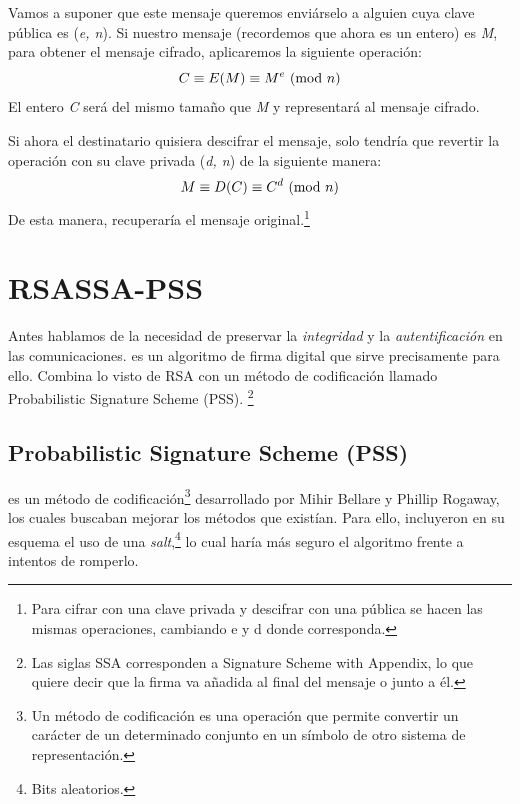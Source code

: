  Vamos a suponer que este mensaje queremos enviárselo a alguien cuya clave pública es (\emph{e, n}).
 Si nuestro mensaje (recordemos que ahora es un entero) es \emph{M}, para obtener el mensaje cifrado, aplicaremos la siguiente operación:
 \[ C \equiv E(M) \equiv M^e \ (\mathrm{mod}\ n) \]
 El entero \emph{C} será del mismo tamaño que \emph{M} y representará al mensaje cifrado.

 Si ahora el destinatario quisiera descifrar el mensaje, solo tendría que revertir la operación con su clave privada (\emph{d, n}) de la siguiente manera:
 \[ M \equiv D(C) \equiv C^d \ (\mathrm{mod}\ n) \]
 De esta manera, recuperaría el mensaje original.\footnote{Para cifrar con una clave privada y descifrar con una pública se hacen las mismas operaciones, cambiando e y d donde corresponda.} \emph{\parencite{Reference12}}


 \section{RSASSA-PSS}

 Antes hablamos de la necesidad de preservar la \emph{integridad} y la \emph{autentificación} en las comunicaciones.
  es un algoritmo de firma digital que sirve precisamente para ello.
 Combina lo visto de RSA con un método de codificación llamado Probabilistic Signature Scheme (PSS).
 \footnote{Las siglas SSA corresponden a Signature Scheme with Appendix, lo que quiere decir que la firma va añadida al final del mensaje o junto a él.}

 \subsection{Probabilistic Signature Scheme (PSS)}

  es un método de codificación\footnote{Un método de codificación es una operación que permite convertir un carácter de un determinado conjunto en un símbolo de otro sistema de representación.}
 desarrollado por Mihir Bellare y Phillip Rogaway, los cuales buscaban mejorar los métodos que existían.
 Para ello, incluyeron en su esquema el uso de una \emph{salt},\footnote{Bits aleatorios.} lo cual haría más seguro el algoritmo frente a intentos de romperlo. \emph{\parencite{Reference15}}

